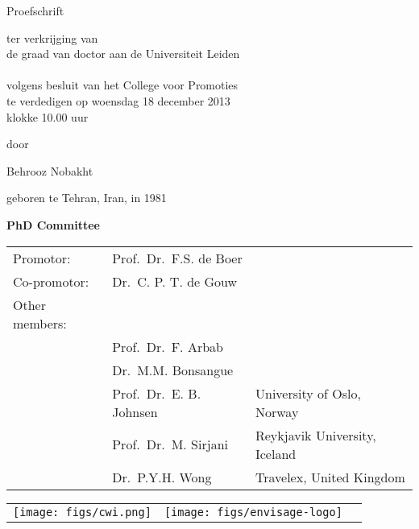 \begin{titlepage}
\begin{center}
\par\vspace {2.1cm}
{\large \textsc Proefschrift}
\par\vspace {1.5cm}
{\large ter verkrijging van\\[.5cm]
de graad van doctor aan de Universiteit Leiden\\[.5cm]
\\[.5cm]
volgens besluit van het College voor Promoties\\[.5cm]
te verdedigen %
op woensdag 18 december 2013\\[.5cm]
klokke 10.00 uur \\[.5cm] }
\par\vspace {1cm} {\large door}
\par \vspace {.5cm} %
{\Large Behrooz Nobakht}    
\par%
{\large geboren te Tehran, Iran, in 1981} %
\end{center}
\clearpage
\noindent%
{\Large\textbf{PhD Committee}}\\[.5cm]

\begin{tabular}{lll}
Promotor:    & Prof.\ Dr.\ F.S. de Boer & \\
Co-promotor: & Dr.\ C. P. T. de Gouw & \\[12pt]
Other members:\\
& Prof.\ Dr.\ F. Arbab & \\
& Dr.\ M.M. Bonsangue & \\
& Prof.\ Dr.\ E. B. Johnsen & University of Oslo, Norway\\
& Prof.\ Dr.\ M. Sirjani & Reykjavik University, Iceland\\
& Dr.\ P.Y.H. Wong & Travelex, United Kingdom\\
\end{tabular}

\vfill
\vspace{5.5cm}

\hspace{-0.5cm}
\begin{tabular}{lll}
\texttt{[image: figs/cwi.png]} &
\texttt{[image: figs/envisage-logo]} &
\end{tabular}


\end{titlepage}
